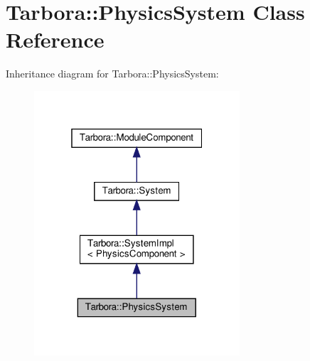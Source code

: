 \hypertarget{classTarbora_1_1PhysicsSystem}{}\section{Tarbora\+:\+:Physics\+System Class Reference}
\label{classTarbora_1_1PhysicsSystem}


Inheritance diagram for Tarbora\+:\+:Physics\+System\+:\nopagebreak
\begin{figure}[H]
\begin{center}
\leavevmode
\includegraphics[width=217pt]{classTarbora_1_1PhysicsSystem__inherit__graph}
\end{center}
\end{figure}


